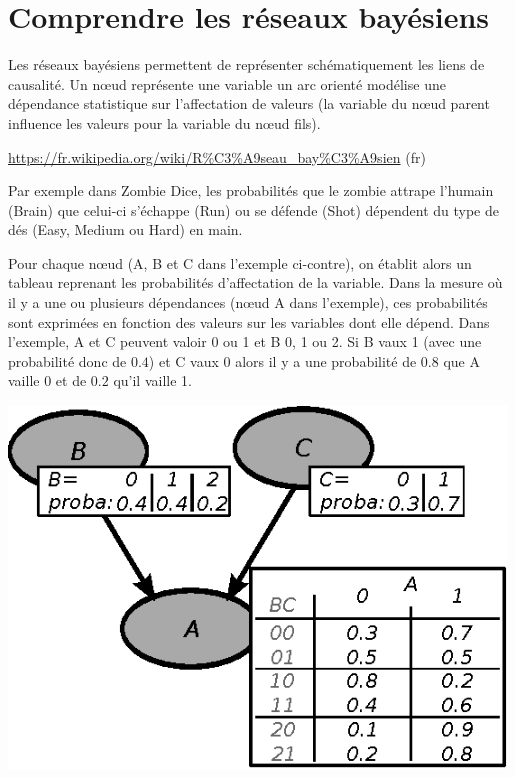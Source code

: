 \documentclass[a4paper, 10pt]{article}
\begin{document}
\section{Comprendre les réseaux bayésiens}


  Les réseaux bayésiens permettent de représenter schématiquement les liens de causalité.
  Un n\oe{}ud représente une variable un arc orienté modélise une dépendance statistique sur l'affectation de valeurs (la variable du n\oe{}ud parent influence les valeurs pour la variable du n\oe{}ud fils).

  \url{https://fr.wikipedia.org/wiki/R\%C3\%A9seau_bay\%C3\%A9sien} (fr)

  \begin{minipage}{0.64\textwidth}

  \medskip
  Par exemple dans Zombie Dice, les probabilités que le zombie attrape l'humain (Brain) que celui-ci s'échappe (Run) ou se défende (Shot) dépendent du type de dés (Easy, Medium ou Hard) en main.

  \medskip
  Pour chaque n\oe{}ud (A, B et C dans l'exemple ci-contre), on établit alors un tableau reprenant les probabilités d'affectation de la variable.
  Dans la mesure où il y a une ou plusieurs dépendances (n\oe{}ud A dans l'exemple), ces probabilités sont exprimées en fonction des valeurs sur les variables dont elle dépend.
  Dans l'exemple, A et C peuvent valoir 0 ou 1 et B 0, 1 ou 2. Si B vaux 1 (avec une probabilité donc de $0.4$) et C vaux 0 alors il y a une probabilité de $0.8$ que A vaille 0 et de $0.2$ qu'il vaille 1.

  \end{minipage}
  \begin{minipage}{0.33\textwidth}

     \centering
     \includegraphics[width=0.99\textwidth]{fig/resbay}

  \end{minipage}
\end{document}
